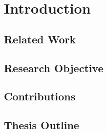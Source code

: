 %
\chapter{Introduction} \label{chap::intro}

\section{Related Work}

\section{Research Objective}

\section{Contributions}

\section{Thesis Outline}


